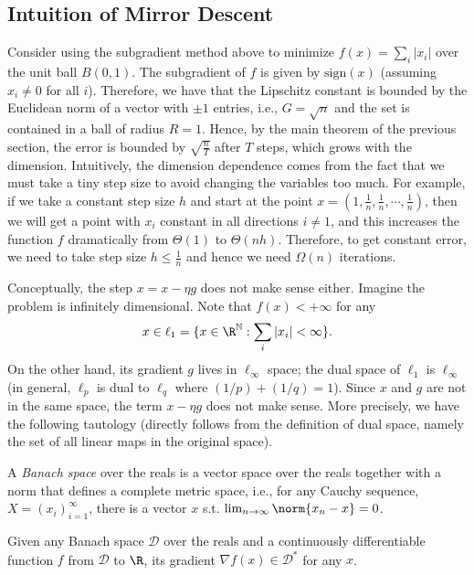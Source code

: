\subsection{Intuition of Mirror Descent}

Consider using the subgradient method above to minimize $f(x)=\sum_{i}|x_{i}|$
over the unit ball $B(0,1)$. The subgradient of $f$ is given by
$\text{sign}(x)$ (assuming $x_{i}\neq0$ for all $i$). Therefore,
we have that the Lipschitz constant is bounded by the Euclidean norm
of a vector with $\pm1$ entries, i.e., $G=\sqrt{n}$ and the set
is contained in a ball of radius $R=1$. Hence, by the main theorem
of the previous section, the error is bounded by $\sqrt{\frac{n}{T}}$
after $T$ steps, which grows with the dimension. Intuitively, the
dimension dependence comes from the fact that we must take a tiny
step size to avoid changing the variables too much. For example, if
we take a constant step size $h$ and start at the point $x=(1,\frac{1}{n},\frac{1}{n},\cdots,\frac{1}{n})$,
then we will get a point with $x_{i}$ constant in all directions
$i\neq1$, and this increases the function $f$ dramatically from
$\Theta(1)$ to $\Theta(nh)$. Therefore, to get constant error, we
need to take step size $h\le\frac{1}{n}$ and hence we need $\Omega(n)$
iterations.

Conceptually, the step $x=x-\eta g$ does not make sense either. Imagine
the problem is infinitely dimensional. Note that $f(x)<+\infty$ for
any 
\[
x\in\ell_{1}=\{x\in\R^{\mathbb{N}}:\sum_{i}|x_{i}|<\infty\}.
\]
On the other hand, its gradient $g$ lives in $\ell_{\infty}$ space;
the dual space of $\ell_{1}$ is $\ell_{\infty}$ (in general, $\ell_{p}$
is dual to $\ell_{q}$ where $(1/p)+(1/q)=1$). Since $x$ and $g$
are not in the same space, the term $x-\eta g$ does not make sense.
More precisely, we have the following tautology (directly follows
from the definition of dual space, namely the set of all linear maps
in the original space).
\begin{defn}
A \emph{Banach space }over the reals is a vector space over the reals
together with a norm that defines a complete metric space, i.e., for
any Cauchy sequence, $X=(x_{i})_{i=1}^{\infty}$, there is a vector
$x$ s.t. $\lim_{n\rightarrow\infty}\norm{x_{n}-x}=0$. 
\end{defn}

\begin{fact}
\label{lem:grad_dual}Given any Banach space $\mathcal{D}$ over the
reals and a continuously differentiable function $f$ from $\mathcal{D}$
to $\R$, its gradient $\nabla f(x)\in\mathcal{D}^{*}$ for any $x$.
\end{fact}

